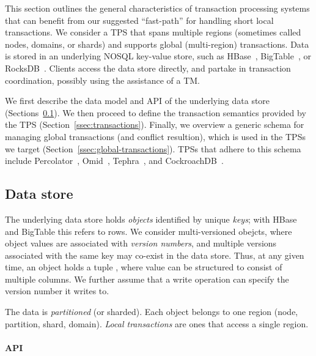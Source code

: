 
This section outlines the general characteristics of transaction processing systems that can benefit from our 
suggested ``fast-path'' for handling short local transactions. 
We consider a TPS  that spans multiple regions (sometimes called nodes, domains, or shards) and supports global
(multi-region) transactions. Data is stored in an underlying NOSQL key-value store, 
such as HBase~\cite{hbase}, BigTable~\cite{bigtable-osdi06},  or
RocksDB~\cite{rocksdb}. Clients access the data store directly, and partake in transaction
coordination, possibly using the assistance of a TM.

We first describe the data model and API of the underlying data store (Sections~\ref{ssec:data-model}).
We then proceed to define  the transaction semantics provided by the TPS
(Section~\ref{ssec:transactions}). Finally, we overview a generic schema for managing global transactions 
(and conflict resultion), which is used in the TPSs we target (Section~\ref{ssec:global-transactions}).
TPSs that adhere to this schema include Percolator~\cite{Percolator2010}, Omid~\cite{OmidICDE2014}, Tephra~\cite{tephra}, and CockroachDB~\cite{cockroach}.

\subsection{Data store}
\label{ssec:data-model}

The underlying data store holds  \emph{objects}  identified by unique \emph{keys}; with HBase and BigTable this refers to rows.
We consider multi-versioned obejcts, where object values are associated with \emph{version numbers}, and
multiple versions associated with the same key may co-exist in the data store.
Thus, at any given time, an object holds a tuple , where value
can be structured to consist of multiple columns.
We further assume that a write operation can specify the version number it writes to.

The data is \emph{partitioned} (or sharded). Each object belongs to one region
(node, partition, shard, domain). \emph{Local transactions} are ones that access
a single region.

\paragraph{API} 

